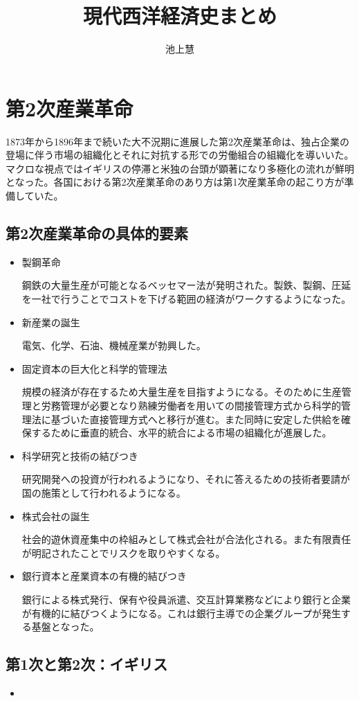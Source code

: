 \documentclass{jsarticle}
\begin{document}
\title{現代西洋経済史まとめ}
\author{池上慧}
\maketitle

\section{第2次産業革命}
1873年から1896年まで続いた大不況期に進展した第2次産業革命は、独占企業の登場に伴う市場の組織化とそれに対抗する形での労働組合の組織化を導いいた。マクロな視点ではイギリスの停滞と米独の台頭が顕著になり多極化の流れが鮮明となった。各国における第2次産業革命のあり方は第1次産業革命の起こり方が準備していた。
\subsection{第2次産業革命の具体的要素}
\begin{itemize}
\item 製鋼革命

鋼鉄の大量生産が可能となるベッセマー法が発明された。製鉄、製鋼、圧延を一社で行うことでコストを下げる範囲の経済がワークするようになった。
\item 新産業の誕生

電気、化学、石油、機械産業が勃興した。
\item 固定資本の巨大化と科学的管理法

規模の経済が存在するため大量生産を目指すようになる。そのために生産管理と労務管理が必要となり熟練労働者を用いての間接管理方式から科学的管理法に基づいた直接管理方式へと移行が進む。また同時に安定した供給を確保するために垂直的統合、水平的統合による市場の組織化が進展した。
\item 科学研究と技術の結びつき

研究開発への投資が行われるようになり、それに答えるための技術者要請が国の施策として行われるようになる。
\item 株式会社の誕生

社会的遊休資産集中の枠組みとして株式会社が合法化される。また有限責任が明記されたことでリスクを取りやすくなる。
\item 銀行資本と産業資本の有機的結びつき

銀行による株式発行、保有や役員派遣、交互計算業務などにより銀行と企業が有機的に結びつくようになる。これは銀行主導での企業グループが発生する基盤となった。
\end{itemize}
\subsection{第1次と第2次：イギリス}
\begin{itemize}
\item 
\end{itemize}
\end{document}
